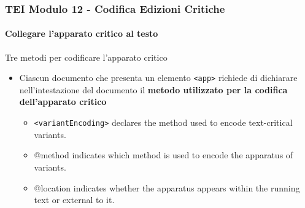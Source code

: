 \begin{frame}
    \frametitle{TEI Modulo 12 - Codifica Edizioni Critiche}
    \framesubtitle{Collegare l'apparato critico al testo}
    \addtocounter{nframe}{1}
  





    \begin{block}{Tre metodi per codificare l'apparato critico}
       \begin{itemize}
           \item Ciascun documento che presenta un elemento \texttt{<app>} richiede di dichiarare nell'intestazione del documento il \textbf{metodo utilizzato per la codifica dell'apparato critico}
           \begin{itemize}
             \item \texttt{<variantEncoding>} declares the method used to encode text-critical variants.
             \item @method indicates which method is used to encode the apparatus of variants.
             \item @location indicates whether the apparatus appears within the running text or external to it.
           \end{itemize}
       \end{itemize}
     \end{block}

\end{frame}


